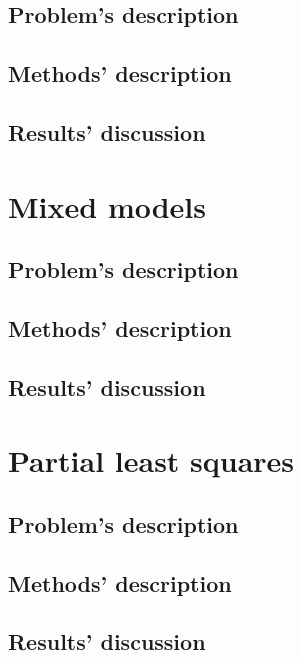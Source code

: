 \documentclass{report}
\begin{document}
\section{Problem's description}

\section{Methods' description}

\section{Results' discussion}


\chapter{Mixed models}
\section{Problem's description}

\section{Methods' description}

\section{Results' discussion}


\chapter{Partial least squares}
\section{Problem's description}

\section{Methods' description}

\section{Results' discussion}
\end{document}
